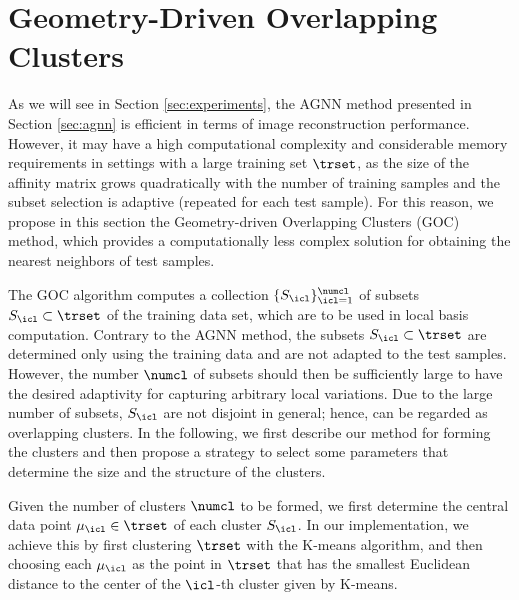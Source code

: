 \documentclass[journal]{IEEEtran}
\begin{document}
%
%
%
%
\section{Geometry-Driven Overlapping Clusters}
\label{sec:goc}

As we will see in Section \ref{sec:experiments}, the AGNN method presented in Section \ref{sec:agnn} is efficient in terms of image reconstruction performance. However, it may have a high computational complexity and considerable memory requirements in settings with a large training set $\trset$, as the size of the affinity matrix grows quadratically with the number of training samples and the subset selection is adaptive (repeated for each test sample). For this reason, we propose in this section the Geometry-driven Overlapping Clusters (GOC) method, which provides a computationally less complex solution for obtaining the nearest neighbors of test samples.

The GOC algorithm computes a collection $\{S_\icl \}_{\icl=1}^\numcl$ of subsets  $S_\icl \subset \trset$ of the training data set, which are to be used in local basis computation. Contrary to the AGNN method, the subsets $S_\icl \subset \trset$ are determined only using the training data and are not adapted to the test samples. However, the number  $\numcl$ of subsets should then be sufficiently large to have the desired adaptivity for capturing arbitrary local variations. Due to the large number of subsets, $S_\icl$ are not disjoint in general; hence, can be regarded as overlapping clusters. In the following, we first describe our method for forming the clusters and then propose a strategy to select some parameters that determine the size and the structure of the clusters. 


Given the number of clusters $\numcl$ to be formed, we first determine the central data point $\mu_\icl \in \trset$ of each cluster $S_\icl$. In our implementation, we achieve this by first clustering $\trset$ with the K-means algorithm, and then choosing each $\mu_\icl$ as the point in $\trset$ that has the smallest Euclidean distance to the center of the $\icl$-th cluster given by K-means. 
\end{document}
